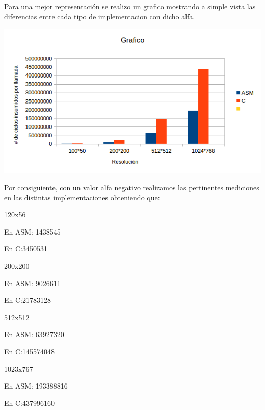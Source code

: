  Para una mejor representación se realizo un grafico mostrando a simple vista
 las diferencias entre cada tipo de implementacion con dicho alfa.
 \vspace*{0.3cm} \vspace*{0.3cm}
  \begin{center}
 \includegraphics[scale=1]{ldr+.png}
 \end{center}
  \vspace*{0.3cm} 

  Por consiguiente, con un valor alfa negativo realizamos las pertinentes mediciones en las distintas implementaciones 
  obteniendo que: \vspace*{0.3cm} \noindent
  
  
  120x56
  
En ASM: 1438545

En C:3450531

 \vspace*{0.3cm} \noindent
200x200

En ASM: 9026611

En C:21783128

 \vspace*{0.3cm} \noindent
512x512

En ASM: 63927320

En C:145574048

 \vspace*{0.3cm} \noindent
1023x767

En ASM: 193388816

En C:437996160


  
  \vspace*{0.3cm}

